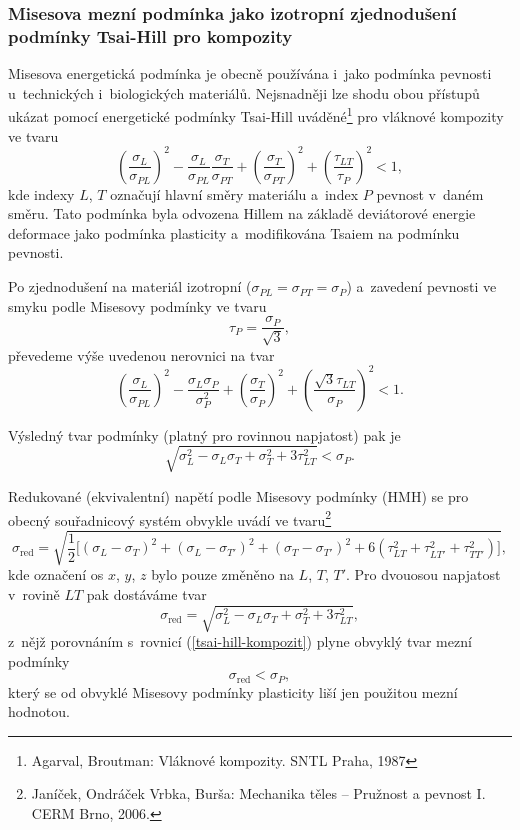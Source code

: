 \subsubsection{Misesova mezní podmínka jako izotropní zjednodušení podmínky Tsai-Hill pro kompozity}
Misesova energetická podmínka je obecně používána i~jako podmínka pevnosti u~technických i~biologických materiálů.
Nejsnadněji lze shodu obou přístupů ukázat pomocí energetické podmínky Tsai-Hill uváděné\footnote{Agarval, Broutman: Vláknové kompozity. SNTL Praha, 1987} pro vláknové kompozity ve tvaru
\begin{equation}
	\left(\frac{\sigma_L}{\sigma_{PL}}\right)^2
	- \frac{\sigma_L}{\sigma_{PL}} \frac{\sigma_T}{\sigma_{PT}}
	+ \left(\frac{\sigma_T}{\sigma_{PT}}\right)^2
	+ \left(\frac{\tau_{LT}}{\tau_P}\right)^2 < 1,
\end{equation}
kde indexy $L$, $T$ označují hlavní směry materiálu a~index $P$ pevnost v~daném směru. Tato podmínka byla odvozena Hillem na základě deviátorové energie deformace jako podmínka plasticity a~modifikována Tsaiem na podmínku pevnosti.

Po zjednodušení na materiál izotropní ($\sigma_{PL}= \sigma_{PT} = \sigma_P$) a~zavedení pevnosti ve smyku podle Misesovy podmínky ve tvaru
\begin{equation}
	\tau_P = \frac{\sigma_P}{\sqrt{3}},
\end{equation}
převedeme výše uvedenou nerovnici na tvar
\begin{equation}
	\left(\frac{\sigma_L}{\sigma_{PL}}\right)^2
	- \frac{\sigma_L \sigma_P}{\sigma_P^2}
	+ \left(\frac{\sigma_T}{\sigma_P}\right)^2
	+ \left(\frac{\sqrt{3} \tau_{LT}}{\sigma_P}\right)^2 < 1.
\end{equation}

Výsledný tvar podmínky (platný pro rovinnou napjatost) pak je
\begin{equation}\label{tsai-hill-kompozit}
	\sqrt{\sigma_L^2 - \sigma_L\sigma_T + \sigma_T^2 + 3\tau_{LT}^2} < \sigma_P.
\end{equation}

Redukované (ekvivalentní) napětí podle Misesovy podmínky (HMH) se pro obecný souřadnicový systém obvykle uvádí ve tvaru\footnote{Janíček, Ondráček Vrbka, Burša: Mechanika těles -- Pružnost a pevnost I. CERM Brno, 2006.}
\begin{equation}
	\sigma_\text{red}
	= \sqrt{\frac{1}{2} \bigg[ (\sigma_L-\sigma_T)^2 + (\sigma_L-\sigma_{T'})^2 + (\sigma_T-\sigma_{T'})^2 + 6 \left( \tau_{LT}^2 + \tau_{LT'}^2 + \tau_{TT'}^2 \right) \bigg]},
\end{equation}
kde označení os $x$, $y$, $z$ bylo pouze změněno na $L$, $T$, $T'$.
Pro dvouosou napjatost v~rovině $LT$ pak dostáváme tvar
\begin{equation}
	\sigma_\text{red} = \sqrt{\sigma_L^2 - \sigma_L\sigma_T + \sigma_T^2 + 3\tau_{LT}^2},
\end{equation}
z~nějž porovnáním s~rovnicí (\ref{tsai-hill-kompozit}) plyne obvyklý tvar mezní podmínky
\begin{equation}
	\sigma_\text{red} < \sigma_P,
\end{equation}
který se od obvyklé Misesovy podmínky plasticity liší jen použitou mezní hodnotou.
